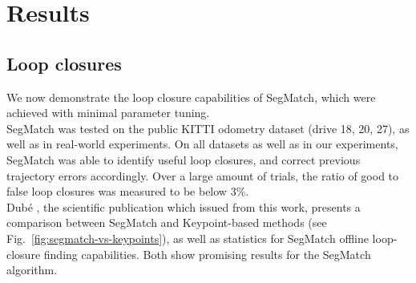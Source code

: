\section{Results}
\label{sec:segmatch-results}


\subsection{Loop closures}

We now demonstrate the loop closure capabilities of SegMatch, which were achieved with minimal parameter tuning.\\

SegMatch was tested on the public KITTI odometry dataset (drive 18, 20, 27), as well as in real-world experiments. On all datasets as well as in our experiments, SegMatch was able to identify useful loop closures, and correct previous trajectory errors accordingly. Over a large amount of trials, the ratio of good to false loop closures was measured to be below 3\%.\\

Dubé \cite{segmatch}, the scientific publication which issued from this work, presents a comparison between SegMatch and Keypoint-based methods (see Fig.~\ref{fig:segmatch-vs-keypoints}), as well as statistics for SegMatch offline loop-closure finding capabilities. Both show promising results for the SegMatch algorithm.\\

